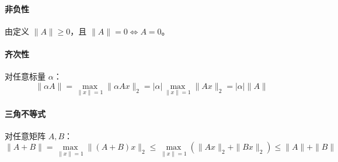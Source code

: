 \paragraph{非负性}  
由定义 \( \|A\| \geq 0 \)，且 \( \|A\| = 0 \iff A = 0 \)。

\paragraph{齐次性}  
对任意标量 \( \alpha \)：
\[
\|\alpha A\| = \max_{\|x\|=1} \|\alpha Ax\|_2 = |\alpha| \max_{\|x\|=1} \|Ax\|_2 = |\alpha| \|A\|
\]

\paragraph{三角不等式}  
对任意矩阵 \( A, B \)：
\[
\|A + B\| = \max_{\|x\|=1} \|(A + B)x\|_2 \leq \max_{\|x\|=1} (\|Ax\|_2 + \|Bx\|_2) \leq \|A\| + \|B\|
\]